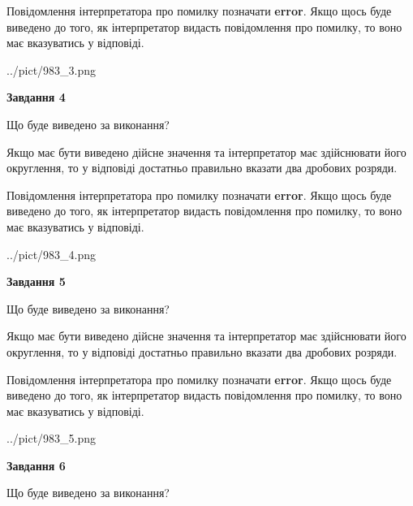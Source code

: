 \documentclass[12pt, ukrainian]{article}
\begin{document}
{\begin {Large}
Повідомлення інтерпретатора про помилку позначати \textbf{error}.
Якщо щось буде виведено до того, як інтерпретатор видасть повідомлення про помилку, 
то воно має вказуватись у відповіді. \par

\begin{center}
	{../pict/983_3.png}
\end{center}
\newpage

{\begin {center}\textbf{Завдання 4}\end {center}}\par
Що буде виведено за виконання? \par

Якщо має бути виведено дійсне значення та інтерпретатор має здійснювати його округлення, 
то у відповіді достатньо правильно вказати два дробових розряди.

Повідомлення інтерпретатора про помилку позначати \textbf{error}.
Якщо щось буде виведено до того, як інтерпретатор видасть повідомлення про помилку, 
то воно має вказуватись у відповіді. \par

\begin{center}
	{../pict/983_4.png}
\end{center}
\newpage

{\begin {center}\textbf{Завдання 5}\end {center}}\par
Що буде виведено за виконання? \par

Якщо має бути виведено дійсне значення та інтерпретатор має здійснювати його округлення, 
то у відповіді достатньо правильно вказати два дробових розряди.

Повідомлення інтерпретатора про помилку позначати \textbf{error}.
Якщо щось буде виведено до того, як інтерпретатор видасть повідомлення про помилку, 
то воно має вказуватись у відповіді. \par

\begin{center}
	{../pict/983_5.png}
\end{center}
\newpage

{\begin {center}\textbf{Завдання 6}\end {center}}\par
Що буде виведено за виконання? \par


\end{Large}}
\end{document}
